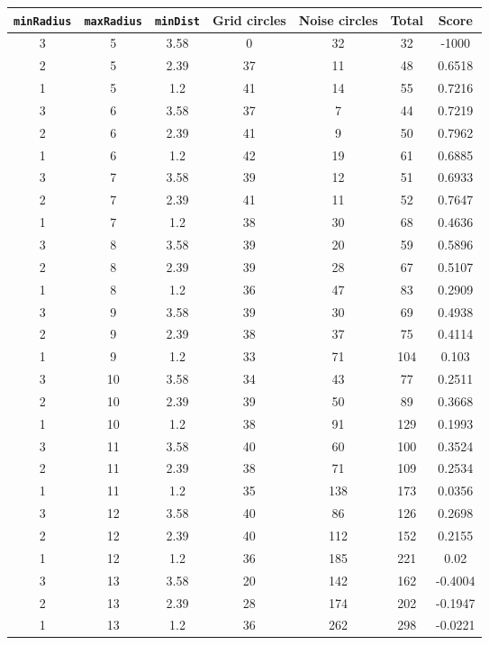 \documentclass[letterpaper, 12pt]{article}
\begin{document}
\begin{longtable}{|c|c|c|c|c|c|c|}
\hline
\textbf{\texttt{minRadius}} & \textbf{\texttt{maxRadius}} & \textbf{\texttt{minDist}} & \textbf{Grid circles} & \textbf{Noise circles} & \textbf{Total} & \textbf{Score} \\
\hline
3 & 5 & 3.58 & 0 & 32 & 32 & -1000 \\
\hline
2 & 5 & 2.39 & 37 & 11 & 48 & 0.6518 \\
\hline
1 & 5 & 1.2 & 41 & 14 & 55 & 0.7216 \\
\hline
3 & 6 & 3.58 & 37 & 7 & 44 & 0.7219 \\
\hline
2 & 6 & 2.39 & 41 & 9 & 50 & 0.7962 \\
\hline
1 & 6 & 1.2 & 42 & 19 & 61 & 0.6885 \\
\hline
3 & 7 & 3.58 & 39 & 12 & 51 & 0.6933 \\
\hline
2 & 7 & 2.39 & 41 & 11 & 52 & 0.7647 \\
\hline
1 & 7 & 1.2 & 38 & 30 & 68 & 0.4636 \\
\hline
3 & 8 & 3.58 & 39 & 20 & 59 & 0.5896 \\
\hline
2 & 8 & 2.39 & 39 & 28 & 67 & 0.5107 \\
\hline
1 & 8 & 1.2 & 36 & 47 & 83 & 0.2909 \\
\hline
3 & 9 & 3.58 & 39 & 30 & 69 & 0.4938 \\
\hline
2 & 9 & 2.39 & 38 & 37 & 75 & 0.4114 \\
\hline
1 & 9 & 1.2 & 33 & 71 & 104 & 0.103 \\
\hline
3 & 10 & 3.58 & 34 & 43 & 77 & 0.2511 \\
\hline
2 & 10 & 2.39 & 39 & 50 & 89 & 0.3668 \\
\hline
1 & 10 & 1.2 & 38 & 91 & 129 & 0.1993 \\
\hline
3 & 11 & 3.58 & 40 & 60 & 100 & 0.3524 \\
\hline
2 & 11 & 2.39 & 38 & 71 & 109 & 0.2534 \\
\hline
1 & 11 & 1.2 & 35 & 138 & 173 & 0.0356 \\
\hline
3 & 12 & 3.58 & 40 & 86 & 126 & 0.2698 \\
\hline
2 & 12 & 2.39 & 40 & 112 & 152 & 0.2155 \\
\hline
1 & 12 & 1.2 & 36 & 185 & 221 & 0.02 \\
\hline
3 & 13 & 3.58 & 20 & 142 & 162 & -0.4004 \\
\hline
2 & 13 & 2.39 & 28 & 174 & 202 & -0.1947 \\
\hline
1 & 13 & 1.2 & 36 & 262 & 298 & -0.0221 \\

\end{longtable}
\end{document}
